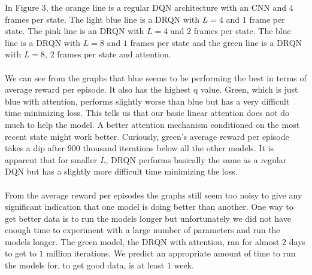 \documentclass{article}
\begin{document}
In Figure 3, the orange line is a regular DQN architecture with an CNN and $4$
frames per state. The light blue line is a DRQN with $L=4$ and $1$ frame per state.
The pink line is an DRQN with $L=4$ and $2$ frames per state. The blue line is a
DRQN with $L=8$ and $1$ frames per state and the green line is a DRQN with $L=8$,
$2$ frames per state and attention. \\
\\
We can see from the graphs that blue seems to be performing the best in terms of
average reward per episode. It also has the highest q value. Green, which is just
blue with attention, performs slightly worse than blue but has a very difficult
time minimizing loss. This tells us that our basic linear attention does not do
much to help the model. A better attention mechanism conditioned on the most recent
state might work better. Curiously, green's average reward per episode takes a
dip after $900$ thousand iterations below all the other models. It is apparent
that for smaller $L$, DRQN performs basically the same as a regular DQN but has a
slightly more difficult time minimizing the loss. \\
\\
From the average reward per episodes the graphs still seem too noisy to give any
significant indication that one model is doing better than another. One way to
get better data is to run the models longer but unfortunately we did not have
enough time to experiment with a large number of parameters and run the models
longer. The green model, the DRQN with attention, ran for almost $2$ days to get
to $1$ million iterations. We predict an appropriate amount of time to run the
models for, to get good data, is at least $1$ week.
\end{document}
